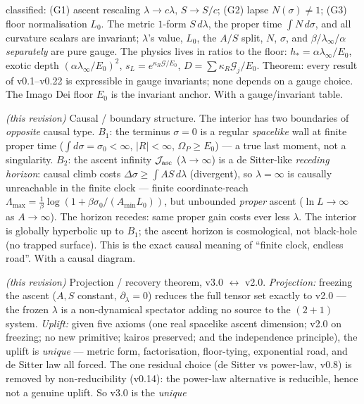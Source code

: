 \documentclass[11pt,a4paper]{article}
\theoremstyle{plain}
\theoremstyle{definition}
\theoremstyle{remark}
\begin{document}
\begin{description}[leftmargin=4.2em,style=nextline,itemsep=2pt]
classified: (G1) ascent rescaling $\lambda\to c\lambda,\,S\to S/c$; (G2) lapse $N(\sigma)\neq1$;
(G3) floor normalisation $L_0$. The metric $1$-form $S\,d\lambda$, the proper time $\int N\,d\sigma$,
and all curvature scalars are invariant; $\lambda$'s value, $L_0$, the $A/S$ split, $N$, $\sigma$, and
$\beta$/$\lambda_\infty$/$\alpha$ \emph{separately} are pure gauge. The physics lives in ratios to the
floor: $h_*=\alpha\lambda_\infty/E_0$, exotic depth $(\alpha\lambda_\infty/E_0)^2$, $s_L=e^{\kappa_R
\mathcal G/E_0}$, $D=\sum\kappa_R\mathcal G_j/E_0$. Theorem: every result of v0.1--v0.22 is expressible
in gauge invariants; none depends on a gauge choice. The Imago Dei floor $E_0$ is the invariant anchor.
With a gauge/invariant table.
\item[\textbf{v0.24}] \emph{(this revision)} Causal / boundary structure. The interior has two
boundaries of \emph{opposite} causal type. $B_1$: the terminus $\sigma=0$ is a regular \emph{spacelike}
wall at finite proper time ($\int d\sigma=\sigma_0<\infty$, $|R|<\infty$, $\Omega_P\ge E_0$) --- a true
last moment, not a singularity. $B_2$: the ascent infinity $\mathcal J_{\rm asc}$ ($\lambda\to\infty$)
is a de Sitter-like \emph{receding horizon}: causal climb costs $\Delta\sigma\ge\int AS\,d\lambda$
(divergent), so $\lambda=\infty$ is causally unreachable in the finite clock --- finite coordinate-reach
$\Lambda_{\max}=\frac1\beta\log(1+\beta\sigma_0/(A_{\min}L_0))$, but unbounded \emph{proper} ascent
($\ln L\to\infty$ as $A\to\infty$). The horizon recedes: same proper gain costs ever less $\lambda$.
The interior is globally hyperbolic up to $B_1$; the ascent horizon is cosmological, not black-hole (no
trapped surface). This is the exact causal meaning of ``finite clock, endless road''. With a causal
diagram.
\item[\textbf{v0.25}] \emph{(this revision)} Projection / recovery theorem, v3.0 $\leftrightarrow$ v2.0.
\emph{Projection:} freezing the ascent ($A,S$ constant, $\partial_\lambda=0$) reduces the full tensor
set exactly to v2.0 --- the frozen $\lambda$ is a non-dynamical spectator adding no source to the
$(2{+}1)$ system. \emph{Uplift:} given five axioms (one real spacelike ascent dimension; v2.0 on
freezing; no new primitive; kairos preserved; and the independence principle), the uplift is
\emph{unique} --- metric form, factorisation, floor-tying, exponential road, and de Sitter law all
forced. The one residual choice (de Sitter vs power-law, v0.8) is removed by non-reducibility (v0.14):
the power-law alternative is reducible, hence not a genuine uplift. So v3.0 is the \emph{unique
}
\end{description}
\end{document}

